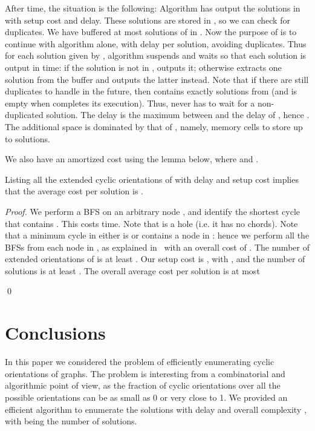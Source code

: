 \documentclass{llncs}
\begin{document}
After  time, the situation is the following: Algorithm  has output the  solutions in  with  setup cost and delay. These solutions are stored in , so we can check for duplicates. We have buffered at most  solutions of  in . Now the purpose of  is to continue with algorithm  alone, with  delay per solution, avoiding duplicates. Thus for each solution given by , algorithm  suspends  and waits so that each solution is output in  time: if the solution is not in ,  outputs it; otherwise  extracts one solution from the buffer  and outputs the latter instead. Note that if there are still  duplicates to handle in the future, then  contains exactly  solutions from   (and  is empty when  completes its execution). Thus,  never has to wait for a non-duplicated solution. The delay is the maximum between  and the delay of , hence . The additional space is dominated by that of , namely,  memory cells to store up to  solutions.


We also have an amortized cost using the lemma below, where  and . 


\begin{lemma}
Listing all the extended cyclic orientations of  with delay  and setup cost  implies that the average cost per solution is .
\label{lem:preproc}
\end{lemma}
\begin{proof}
We perform a BFS on an arbitrary node , and identify the shortest cycle  that contains . This costs  time. 
Note that  is a hole (i.e. it has no chords). Note that a minimum cycle in  either is  or contains a node in : hence we perform all the BFSs from each node in , as explained in~\cite{itai1978finding} with an overall cost of . The number of extended orientations of  is at least .
Our setup cost is , with , and the number of solutions is at least . The overall average cost per solution is at most

\qed
\end{proof}

\section{Conclusions}
\label{sec:conclusions}

In this paper we considered the problem of efficiently enumerating cyclic orientations of graphs. The problem is interesting from a combinatorial and algorithmic point of view, as the fraction of cyclic orientations over all the possible orientations can be as small as 0 or very close to 1. We provided an efficient algorithm to enumerate the solutions with delay  and overall complexity , with  being the number of solutions.
\end{document}
